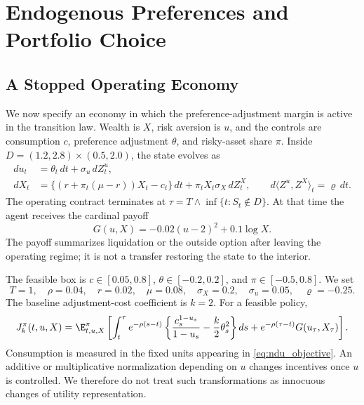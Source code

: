 \section{Endogenous Preferences and Portfolio Choice}
\label{sec:preferences}
\subsection{A Stopped Operating Economy}
We now specify an economy in which the preference-adjustment margin is active in the transition law. Wealth is $X$, risk aversion is $u$, and the controls are consumption $c$, preference adjustment $\theta$, and risky-asset share $\pi$. Inside
$D=(1.2,2.8)\times(0.5,2.0)$, the state evolves as
\begin{align}
 du_t&=\theta_t\,dt+\sigma_u\,dZ_t^u,\label{eq:ndu_u}\\
 dX_t&=\{(r+\pi_t(\mu-r))X_t-c_t\}\,dt
           +\pi_tX_t\sigma_X\,dZ_t^X,\qquad
 d\langle Z^u,Z^X\rangle_t=\varrho\,dt.
 \label{eq:ndu_x}
\end{align}
The operating contract terminates at $\tau=T\wedge\inf\{t:S_t\notin D\}$. At that time the agent receives the cardinal payoff
\begin{equation}
 G(u,X)=-0.02(u-2)^2+0.1\log X.
 \label{eq:ndu_terminal}
\end{equation}
The payoff summarizes liquidation or the outside option after leaving the operating regime; it is not a transfer restoring the state to the interior.

The feasible box is $c\in[0.05,0.8]$, $\theta\in[-0.2,0.2]$, and $\pi\in[-0.5,0.8]$. We set
\begin{equation}
 T=1,\quad \rho=0.04,\quad r=0.02,\quad \mu=0.08,
 \quad \sigma_X=0.2,\quad \sigma_u=0.05,\quad \varrho=-0.25.
 \label{eq:ndu_parameters}
\end{equation}
The baseline adjustment-cost coefficient is $k=2$. For a feasible policy,
\begin{equation}
 J_k^\pi(t,u,X)=\E^\pi_{t,u,X}\left[
 \int_t^\tau e^{-\rho(s-t)}
 \left\{\frac{c_s^{1-u_s}}{1-u_s}-\frac{k}{2}\theta_s^2\right\}ds
 +e^{-\rho(\tau-t)}G(u_\tau,X_\tau)\right].
 \label{eq:ndu_objective}
\end{equation}
Consumption is measured in the fixed units appearing in \eqref{eq:ndu_objective}. An additive or multiplicative normalization depending on $u$ changes incentives once $u$ is controlled. We therefore do not treat such transformations as innocuous changes of utility representation.


